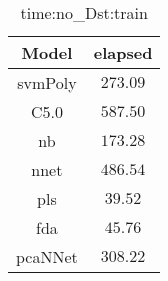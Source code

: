 \begin{table}[!ht]
	\centering
	\begin{tabular}{|c|c|}
		\hline
		Model & elapsed \\ \hline
		svmPoly & $273.09$ \\ \hline
		C5.0 & $587.50$ \\ \hline
		nb & $173.28$ \\ \hline
		nnet & $486.54$ \\ \hline
		pls & $39.52$ \\ \hline
		fda & $45.76$ \\ \hline
		pcaNNet & $308.22$ \\ \hline
	\end{tabular}
	\caption{time:no_Dst:train}
	\label{tab:time:no_Dst:train}
\end{table}
